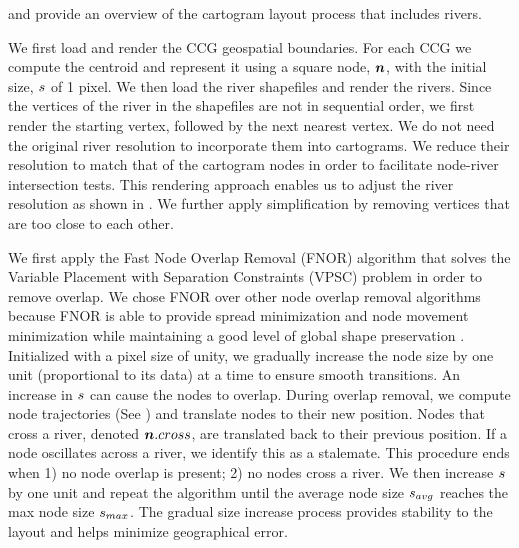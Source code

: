  and  provide an overview of the cartogram layout process that includes rivers.

 We first load and render the CCG geospatial boundaries. For each CCG we compute the centroid and represent it using a square node, $ \bm{n} $, with the initial size, $ s $ of 1 pixel. We then load the river shapefiles and render the rivers. Since the vertices of the river in the shapefiles are not in sequential order, we first render the starting vertex, followed by the next nearest vertex. We do not need the original river resolution to incorporate them into cartograms. We reduce their resolution to match that of the cartogram nodes in order to facilitate node-river intersection tests. This rendering approach enables us to adjust the river resolution as shown in . We further apply simplification by removing vertices that are too close to each other.


 We first apply the Fast Node Overlap Removal (FNOR) algorithm that solves the Variable Placement with Separation Constraints (VPSC) problem \cite{dwyer2006fast} in order to remove overlap. We chose FNOR over other node overlap removal algorithms because FNOR is able to provide spread minimization and node movement minimization while maintaining a good level of global shape preservation \cite{chen2020Node}. Initialized with a pixel size of unity, we gradually increase the node size by one unit (proportional to its data) at a time to ensure smooth transitions. An increase in $ s $ can cause the nodes to overlap. During overlap removal, we compute node trajectories (See ) and translate nodes to their new position. Nodes that cross a river, denoted $ \bm{n}.cross $, are translated back to their previous position. If a node oscillates across a river, we identify this as a stalemate. This procedure ends when 1) no node overlap is present; 2) no nodes cross a river. We then increase $ s $ by one unit and repeat the algorithm until the average node size $ s_{avg} $ reaches the max node size $ s_{max} $. The gradual size increase process provides stability to the layout and helps minimize geographical error.

